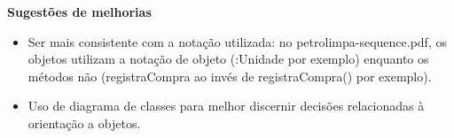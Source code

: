 \documentclass{article}
\begin{document}
\bigskip
\bigskip
\textbf{\LARGE{Sugestões de melhorias}}

\begin{itemize}

\item Ser mais consistente com a notação utilizada: no petrolimpa-sequence.pdf, os objetos utilizam a notação de objeto (:Unidade por exemplo) enquanto os métodos não (registraCompra ao invés de registraCompra() por exemplo).

\item Uso de diagrama de classes para melhor discernir decisões relacionadas à orientação a objetos.

\end{itemize}
\end{document}
